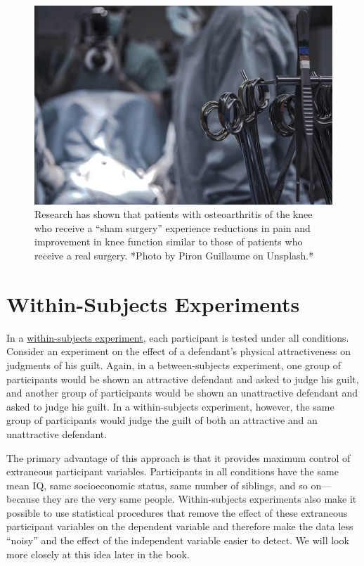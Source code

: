 \documentclass[
]{krantz}
\begin{document}
\begin{figure}

{\centering \includegraphics[width=0.5\linewidth]{images/experiments/surgery} 

}

\caption{Research has shown that patients with osteoarthritis of the knee who receive a “sham surgery” experience reductions in pain and improvement in knee function similar to those of patients who receive a real surgery. *Photo by Piron Guillaume on Unsplash.*}\label{fig:surgery}
\end{figure}

\hypertarget{within-subjects-experiments}{%
\section{Within-Subjects Experiments}\label{within-subjects-experiments}}

In a \protect\hyperlink{within-subjects-experiment}{within-subjects experiment}, each participant is tested under all conditions. Consider an experiment on the effect of a defendant's physical attractiveness on judgments of his guilt. Again, in a between-subjects experiment, one group of participants would be shown an attractive defendant and asked to judge his guilt, and another group of participants would be shown an unattractive defendant and asked to judge his guilt. In a within-subjects experiment, however, the same group of participants would judge the guilt of both an attractive and an unattractive defendant.

The primary advantage of this approach is that it provides maximum control of extraneous participant variables. Participants in all conditions have the same mean IQ, same socioeconomic status, same number of siblings, and so on---because they are the very same people. Within-subjects experiments also make it possible to use statistical procedures that remove the effect of these extraneous participant variables on the dependent variable and therefore make the data less ``noisy'' and the effect of the independent variable easier to detect. We will look more closely at this idea later in the book.
\end{document}
